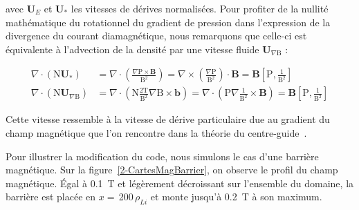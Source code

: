 \begin{refsection}
avec $\mathbf U_E$ et $\mathbf U_*$ les vitesses de dérives normalisées.
Pour profiter de la nullité mathématique du rotationnel du gradient de
pression dans l'expression de la divergence du courant
diamagnétique, nous remarquons que celle-ci est équivalente à l'advection de la
densité par une vitesse fluide $\mathbf U_{\nabla\text{B}}$ :

\begin{align}
\nabla\cdot\left(\text{N}\mathbf U_{*}\right)&=
\nabla\cdot\left(\frac{\nabla\text{P}\times\mathbf
B}{\text{B}^2}\right)=
\nabla\times\left(\frac{\nabla\text{P}}{\text{B}^2}\right)\cdot
\mathbf B=\mathbf B\left[\text{P},\frac{1}{\text{B}^2}\right]\\
\nabla\cdot\left(\text{N}\mathbf U_{\nabla\text{B}}\right)&=
\nabla\cdot\left(\text{N}\frac{2\text{T}}{\text{B}^2}\nabla\text{B}\times\mathbf
b\right)=
\nabla\cdot\left(\text{P}\nabla\frac{1}{\text{B}^2}\times\mathbf
B\right)=\mathbf B\left[\text{P},\frac{1}{\text{B}^2}\right]
\end{align}

Cette vitesse ressemble à la vitesse de dérive particulaire due au gradient du
champ magnétique que l'on rencontre dans la théorie du
centre-guide~\parencite{Lee}.

Pour illustrer la modification du code, nous simulons le cas d'une
barrière magnétique. Sur la
figure~\ref{2-CartesMagBarrier}, on observe le profil du champ magnétique. Égal
à 0.1~T et légèrement décroissant sur l'ensemble du domaine, la barrière est
placée en $x=\,$200$\,\rho_{Li}$ et monte jusqu'à 0.2~T à son maximum.


\end{refsection}
